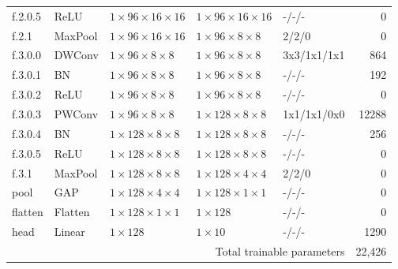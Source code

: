 \begin{longtable}{lllllr}
f.2.0.5 & ReLU & $1\times96\times16\times16$ & $1\times96\times16\times16$ & -/-/- & 0 \\
f.2.1 & MaxPool & $1\times96\times16\times16$ & $1\times96\times8\times8$ & 2/2/0 & 0 \\
f.3.0.0 & DWConv & $1\times96\times8\times8$ & $1\times96\times8\times8$ & 3x3/1x1/1x1 & 864 \\
f.3.0.1 & BN & $1\times96\times8\times8$ & $1\times96\times8\times8$ & -/-/- & 192 \\
f.3.0.2 & ReLU & $1\times96\times8\times8$ & $1\times96\times8\times8$ & -/-/- & 0 \\
f.3.0.3 & PWConv & $1\times96\times8\times8$ & $1\times128\times8\times8$ & 1x1/1x1/0x0 & 12288 \\
f.3.0.4 & BN & $1\times128\times8\times8$ & $1\times128\times8\times8$ & -/-/- & 256 \\
f.3.0.5 & ReLU & $1\times128\times8\times8$ & $1\times128\times8\times8$ & -/-/- & 0 \\
f.3.1 & MaxPool & $1\times128\times8\times8$ & $1\times128\times4\times4$ & 2/2/0 & 0 \\
pool & GAP & $1\times128\times4\times4$ & $1\times128\times1\times1$ & -/-/- & 0 \\
flatten & Flatten & $1\times128\times1\times1$ & $1\times128$ & -/-/- & 0 \\
head & Linear & $1\times128$ & $1\times10$ & -/-/- & 1290 \\
\midrule\multicolumn{5}{r}{Total trainable parameters} & 22,426 \\ \bottomrule
\end{longtable}
\endgroup

